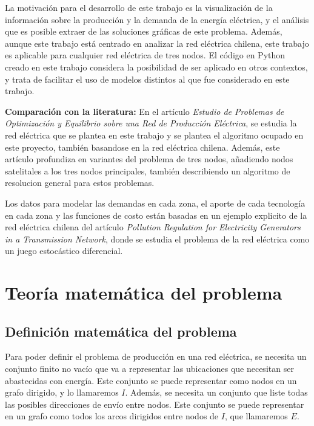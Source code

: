 \documentclass[12pt,twoside]{article}
\begin{document}
	La motivación para el desarrollo de este trabajo es la visualizaci\'on de la información sobre la producción y la demanda de la energía eléctrica, y el an\'alisis que es posible extraer de las soluciones gr\'aficas de este problema. Además, aunque este trabajo est\'a centrado en analizar la red el\'ectrica chilena, este trabajo es aplicable para cualquier red el\'ectrica de tres nodos. El c\'odigo en Python creado en este trabajo considera la posibilidad de ser aplicado en otros contextos, y trata de facilitar el uso de modelos distintos al que fue considerado en este trabajo.
	
	\textbf{Comparaci\'on con la literatura:} En el art\'iculo \textit{Estudio de Problemas de Optimizaci\'on y Equilibrio sobre una Red de Producci\'on El\'ectrica}, se estudia la red el\'ectrica que se plantea en este trabajo y se plantea el algoritmo ocupado en este proyecto, tambi\'en basandose en la red el\'ectrica chilena. Adem\'as, este art\'iculo profundiza en variantes del problema de tres nodos, a\~{n}adiendo nodos satelitales a los tres nodos principales, tambi\'en describiendo un algoritmo de resolucion general para estos problemas.
	
	Los datos para modelar las demandas en cada zona, el aporte de cada tecnolog\'ia en cada zona y las funciones de costo est\'an basadas en un ejemplo explicito de la red el\'ectrica chilena del art\'iculo \textit{Pollution Regulation for Electricity Generators in a Transmission Network}, donde se estudia el problema de la red el\'ectrica como un juego estoc\'astico diferencial.

	
	\newpage
	
	\section{Teor\'ia matem\'atica del problema}
	\subsection{Definici\'on matem\'atica del problema}
	
	\hspace{1cm} Para poder definir el problema de producci\'on en una red el\'ectrica, se necesita un conjunto finito no vac\'io que va a representar las ubicaciones que necesitan ser abastecidas con energ\'ia. Este conjunto se puede representar como nodos en un grafo dirigido, y lo llamaremos \(I\). Adem\'as, se necesita un conjunto que liste todas las posibles direcciones de env\'io entre nodos. Este conjunto se puede representar en un grafo como todos los arcos dirigidos entre nodos de \(I\), que llamaremos \(E\).
	
\end{document}
